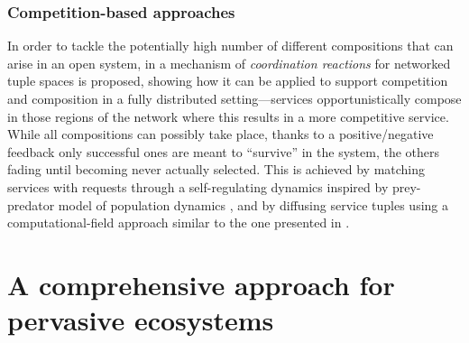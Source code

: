\documentclass[12pt,a4paper,twoside,openright]{book}
\begin{document}
\subsubsection{Competition-based approaches}
In order to tackle the potentially high number of different compositions that can arise in an open system, in \cite{Viroli:11:SOACCPS} a mechanism of \emph{coordination reactions} for networked tuple spaces is proposed, showing how it can be applied to support competition and composition in a fully distributed setting---services opportunistically compose in those regions of the network where this results in a more competitive service.
%
While all compositions can possibly take place, thanks to a positive/negative feedback only successful ones are meant to ``survive'' in the system, the others fading until becoming never actually selected.
%
This is achieved by matching services with requests through a self-regulating dynamics inspired by prey-predator model of population dynamics \cite{Berryman:1992}, and by diffusing service tuples using a computational-field approach similar to the one presented in \cite{tota-aamas2005,proto}.



\section{A comprehensive approach for pervasive ecosystems}
\end{document}
